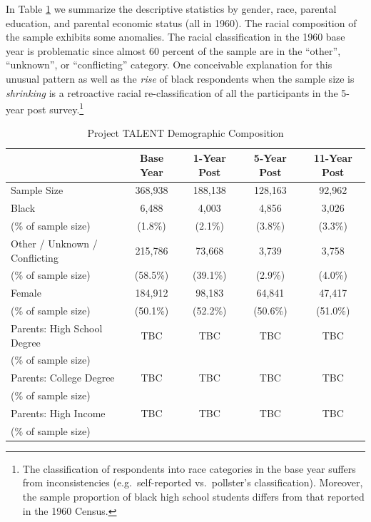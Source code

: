 \documentclass[onehalfspacing,11pt]{article}
\begin{document}
In Table \ref{tab:samplebywave} we summarize the descriptive statistics by gender, race, parental education, and parental economic status (all in 1960). The racial composition of the sample exhibits some anomalies. The racial classification in the 1960 base year is problematic since almost 60 percent of the sample are in the ``other'', ``unknown'', or ``conflicting'' category. One conceivable explanation for this unusual pattern as well as the {\it rise} of black respondents when the sample size is {\it shrinking} is a retroactive racial re-classification of all the participants in the 5-year post survey.\footnote{The classification of respondents into race categories in the base year suffers from inconsistencies (e.g.~self-reported vs.~pollster's classification). Moreover, the sample proportion of black high school students differs from that reported in the 1960 Census.} %
\begin{table}[h!]
  \centering 
  \begin{tabular}{lcccc}
\toprule
   & Base Year & 1-Year Post & 5-Year Post & 11-Year Post\\
   \midrule
Sample Size & 368,938 & 188,138 & 128,163 & 92,962 \\
\midrule
Black   & 6,488 & 4,003 & 4,856 & 3,026 \\

\quad (\% of sample size) & (1.8\%) & (2.1\%) & (3.8\%) & (3.3\%) \\
%
\midrule
Other / Unknown / Conflicting & 215,786 & 73,668 & 3,739 & 3,758 \\
\quad (\% of sample size) & (58.5\%) & (39.1\%) & (2.9\%) & (4.0\%) \\
\midrule
Female   & 184,912 & 98,183 & 64,841 & 47,417 \\
\quad (\% of sample size) & (50.1\%) & (52.2\%) & (50.6\%) & (51.0\%) \\
\midrule
Parents: High School Degree & TBC & TBC & TBC & TBC \\
\quad (\% of sample size) & & & & \\
\midrule
Parents: College Degree & TBC & TBC & TBC & TBC \\
\quad (\% of sample size) & & & & \\
\midrule
Parents: High Income & TBC & TBC & TBC & TBC \\
\quad (\% of sample size) & & & & \\
\midrule
\bottomrule
\end{tabular}

\caption{Project TALENT Demographic Composition}
\label{tab:samplebywave}
\end{table}
\end{document}
